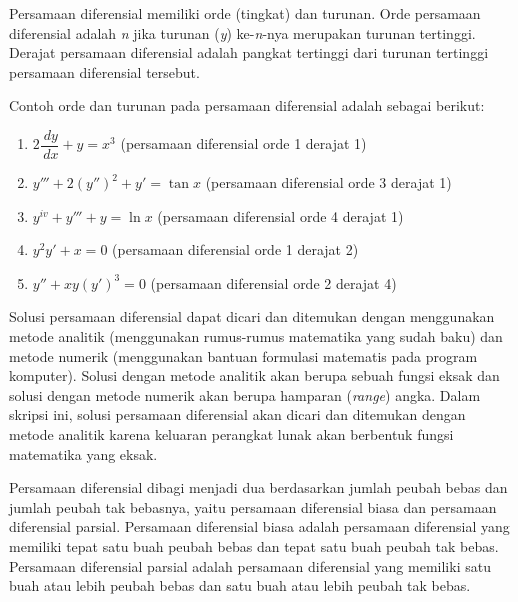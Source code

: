 Persamaan diferensial memiliki orde (tingkat) dan turunan. Orde persamaan diferensial adalah \textit{n} jika turunan (\textit{y}) ke-\textit{n}-nya merupakan turunan tertinggi. Derajat persamaan diferensial adalah pangkat tertinggi dari turunan tertinggi persamaan diferensial tersebut.

Contoh orde dan turunan pada persamaan diferensial adalah sebagai berikut:

\begin{enumerate}

	\item \begin{math} 2\dfrac{\, dy}{\, dx} + y = x^{3} \end{math} (persamaan diferensial orde 1 derajat 1)
	\item \begin{math} y'''+ 2(y'')^{2} + y' = \tan x \end{math} (persamaan diferensial orde 3 derajat 1)
	\item \begin{math} y^{iv} + y''' + y = \ln x \end{math}  (persamaan diferensial orde 4 derajat 1)
	\item \begin{math} y^{2}y' + x = 0 \end{math} (persamaan diferensial orde 1 derajat 2)
	\item \begin{math} y'' + xy(y')^{3} = 0 \end{math}  (persamaan diferensial orde 2 derajat 4)
	
\end{enumerate}

Solusi persamaan diferensial dapat dicari dan ditemukan dengan menggunakan metode analitik (menggunakan rumus-rumus matematika yang sudah baku) dan metode numerik (menggunakan bantuan formulasi matematis pada program komputer). Solusi dengan metode analitik
akan berupa sebuah fungsi eksak dan solusi dengan metode numerik akan berupa hamparan (\textit{range}) angka. Dalam skripsi ini, solusi persamaan diferensial akan dicari dan ditemukan dengan metode analitik karena keluaran perangkat lunak akan berbentuk fungsi matematika yang eksak. 

Persamaan diferensial dibagi menjadi dua berdasarkan jumlah peubah bebas dan jumlah peubah tak bebasnya, yaitu persamaan diferensial biasa dan persamaan diferensial parsial. Persamaan diferensial biasa adalah persamaan diferensial yang memiliki tepat satu buah peubah
bebas dan tepat satu buah peubah tak bebas. Persamaan diferensial parsial adalah persamaan diferensial yang memiliki satu buah atau lebih peubah bebas dan satu buah atau lebih peubah tak bebas.

